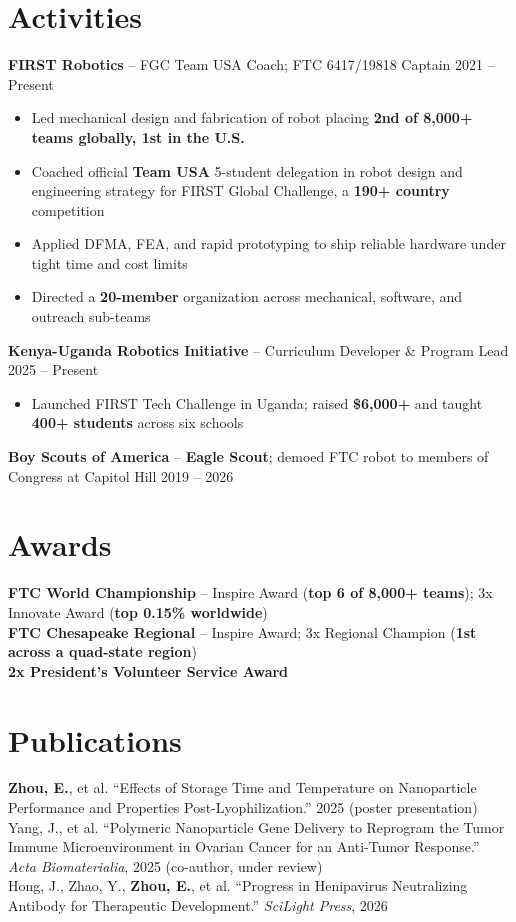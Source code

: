 \documentclass[10pt, letterpaper]{article}
\begin{document}
\section{Activities}
    \textbf{FIRST Robotics} -- FGC Team USA Coach; FTC 6417/19818 Captain
    \hfill 2021 -- Present
    \begin{itemize}
        \item Led mechanical design and fabrication of robot placing \textbf{2nd of 8,000+ teams globally, 1st in the U.S.}
        \item Coached official \textbf{Team USA} 5-student delegation in robot design and  engineering strategy for FIRST Global Challenge, a \textbf{190+ country} competition
        \item Applied DFMA, FEA, and rapid prototyping to ship reliable hardware under tight time and cost limits
        \item Directed a \textbf{20-member} organization across mechanical, software, and outreach sub-teams
    \end{itemize}
    \textbf{Kenya-Uganda Robotics Initiative} -- Curriculum Developer \& Program Lead
    \hfill 2025 -- Present
    \begin{itemize}
        \item Launched FIRST Tech Challenge in Uganda; raised \textbf{\$6,000+} and taught \textbf{400+ students} across six schools
    \end{itemize}
    \textbf{Boy Scouts of America} -- \textbf{Eagle Scout}; demoed FTC robot to members of Congress at Capitol Hill
    \hfill 2019 -- 2026

\section{Awards}
    \textbf{FTC World Championship} -- Inspire Award (\textbf{top 6 of 8,000+ teams}); 3x Innovate Award (\textbf{top 0.15\% worldwide}) \\
    \textbf{FTC Chesapeake Regional} -- Inspire Award; 3x Regional Champion (\textbf{1st across a quad-state region}) \\
    \textbf{2x President's Volunteer Service Award}

\section{Publications}
    \textbf{Zhou, E.}, et al. ``Effects of Storage Time and Temperature on Nanoparticle Performance and Properties Post-Lyophilization.'' 2025 (poster presentation) \\
    Yang, J., et al. ``Polymeric Nanoparticle Gene Delivery to Reprogram the Tumor Immune Microenvironment in Ovarian Cancer for an Anti-Tumor Response.'' \textit{Acta Biomaterialia}, 2025 (co-author, under review) \\
    Hong, J., Zhao, Y., \textbf{Zhou, E.}, et al. ``Progress in Henipavirus Neutralizing Antibody for Therapeutic Development.'' \textit{SciLight Press}, 2026
\end{document}
